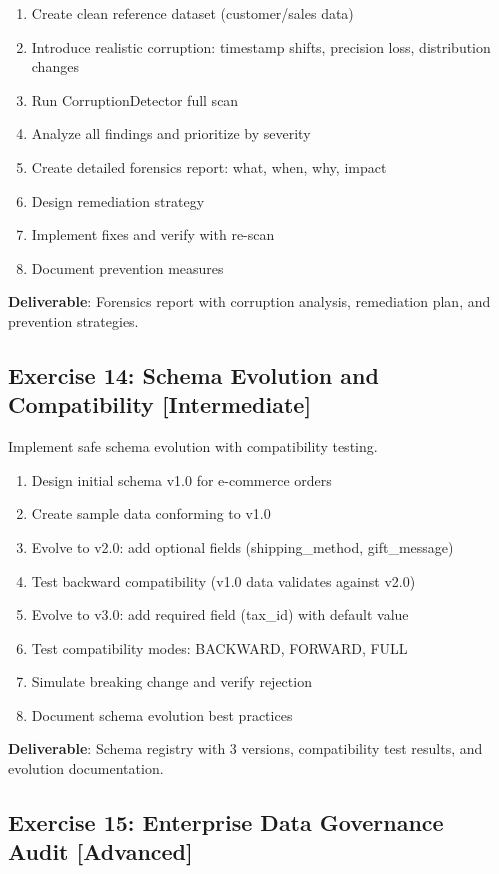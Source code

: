 \begin{enumerate}
    \item Create clean reference dataset (customer/sales data)
    \item Introduce realistic corruption: timestamp shifts, precision loss, distribution changes
    \item Run CorruptionDetector full scan
    \item Analyze all findings and prioritize by severity
    \item Create detailed forensics report: what, when, why, impact
    \item Design remediation strategy
    \item Implement fixes and verify with re-scan
    \item Document prevention measures
\end{enumerate}

\textbf{Deliverable}: Forensics report with corruption analysis, remediation plan, and prevention strategies.

\subsection{Exercise 14: Schema Evolution and Compatibility [Intermediate]}

Implement safe schema evolution with compatibility testing.

\begin{enumerate}
    \item Design initial schema v1.0 for e-commerce orders
    \item Create sample data conforming to v1.0
    \item Evolve to v2.0: add optional fields (shipping\_method, gift\_message)
    \item Test backward compatibility (v1.0 data validates against v2.0)
    \item Evolve to v3.0: add required field (tax\_id) with default value
    \item Test compatibility modes: BACKWARD, FORWARD, FULL
    \item Simulate breaking change and verify rejection
    \item Document schema evolution best practices
\end{enumerate}

\textbf{Deliverable}: Schema registry with 3 versions, compatibility test results, and evolution documentation.

\subsection{Exercise 15: Enterprise Data Governance Audit [Advanced]}

